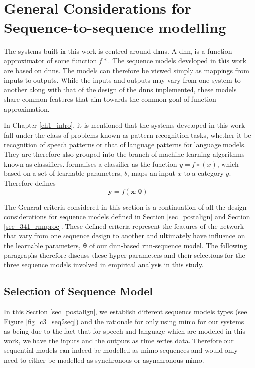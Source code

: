 \section{General Considerations for Sequence-to-sequence modelling}\label{sec_c6_seqdesign}
The systems built in this work is centred around \acrfull{dnns}.  A \acrshort{dnn}, is a function approximator of some function $f\ast$. The sequence models developed in this work are based on \acrshort{dnns}.  The models can therefore be viewed simply as mappings from inputs to outputs.  While the inputs and outputs may vary from one system to another along with that of the design of the \acrshort{dnn}s implemented, these models share common features that aim towards the common goal of function approximation.  

In Chapter \ref{ch1_intro}, it is mentioned that the systems developed in this work fall under the class of problems known as pattern recognition tasks, whether it be recognition of speech patterns or that of language patterns for language models.  They are therefore also grouped into the branch of machine learning algorithms known as classifiers.  \cite{Goodfellow-et-al-2016} formalises a classiﬁer as the function $y=f∗(x)$, which based on a set of learnable parameters, $\theta$, maps an input $x$ to a category $y$. Therefore defines
\begin{equation}\mathbf{y}=f(\mathbf{x;\theta})  \end{equation}\label{eq_c6_classifier}

The General criteria considered in this section is a continuation of all the design considerations for sequence models defined in Section \ref{sec_postalign} and Section \ref{sec_341_rnnproc}.  These defined criteria represent the features of the network that vary from one sequence design to another and ultimately have influence on the learnable parameters, $\mathbf{\theta}$ of our \acrshort{dnn}-based \acrshort{rnn}-sequence model. The following paragraphs therefore discuss these hyper parameters and their selections for the three sequence models involved in empirical analysis in this study.

\subsection{Selection of Sequence Model}\label{sec_c6_seqsel}
In this Section \ref{sec_postalign}, we establish different sequence models types (see Figure \ref{fig_c3_seq2seq}) and the rationale for only using \acrshort{mimo} for our systems as being due to the fact that for speech and language  which are modeled in this work, we have the inputs and the outputs as time series data. Therefore our sequential models can indeed be modelled as \acrshort{mimo} sequences and would only need to either be modelled as synchronous or asynchronous \acrshort{mimo}.

